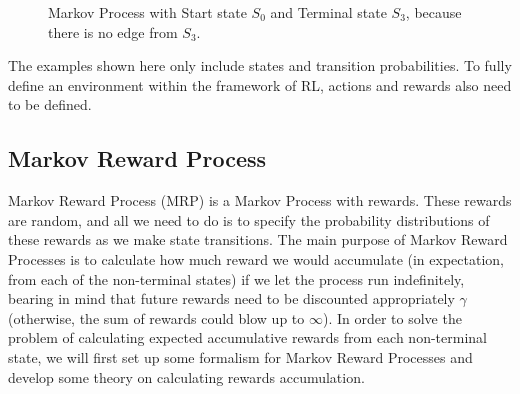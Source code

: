 \documentclass[../xlapes02]{subfiles}
\begin{document}
    \begin{figure}[h!]
        \begin{center}
            \caption{Markov Process with Start state $S_0$ and Terminal state $S_3$, because there is no edge from $S_3$.}
            \label{fig:markov-process}
        \end{center}
        \centering
    \end{figure}

    The examples shown here only include states and transition probabilities. To fully define an environment within the framework of RL, actions and rewards also need to be defined.

    \subsection{Markov Reward Process}\label{subsubsec:markov-reward-process}
    Markov Reward Process (MRP) is a Markov Process with rewards. These rewards are random, and all we need to do is to specify the probability distributions of these rewards as we make state transitions. The main purpose of Markov Reward Processes is to calculate how much reward we would accumulate (in expectation, from each of the non-terminal states) if we let the process run indefinitely, bearing in mind that future rewards need to be discounted appropriately $\gamma$ (otherwise, the sum of rewards could blow up to $\infty$). In order to solve the problem of calculating expected accumulative rewards from each non-terminal state, we will first set up some formalism for Markov Reward Processes and develop some theory on calculating rewards accumulation.
\end{document}
